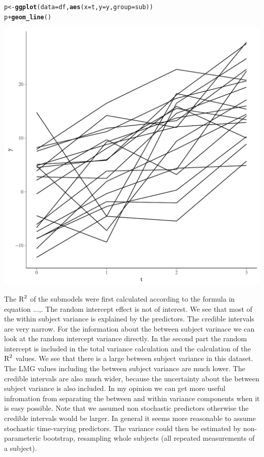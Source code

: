\documentclass[11pt,a4paper,twoside]{book}
\makeatletter
\def\maxwidth{ %
  \ifdim\Gin@nat@width>\linewidth
    \linewidth
  \else
    \Gin@nat@width
  \fi
}
\newcommand{\hlopt}[1]{\textcolor[rgb]{0,0,0}{#1}}%
\newcommand{\hlstd}[1]{\textcolor[rgb]{0.345,0.345,0.345}{#1}}%
\newcommand{\hlkwb}[1]{\textcolor[rgb]{0.69,0.353,0.396}{#1}}%
\newcommand{\hlkwc}[1]{\textcolor[rgb]{0.333,0.667,0.333}{#1}}%
\newcommand{\hlkwd}[1]{\textcolor[rgb]{0.737,0.353,0.396}{\textbf{#1}}}%
\newenvironment{kframe}{%
 \def\at@end@of@kframe{}%
 \ifinner\ifhmode%
  \def\at@end@of@kframe{\end{minipage}}%
  \begin{minipage}{\columnwidth}%
 \fi\fi%
 \def\FrameCommand##1{\hskip\@totalleftmargin \hskip-\fboxsep
 \colorbox{shadecolor}{##1}\hskip-\fboxsep
     \hskip-\linewidth \hskip-\@totalleftmargin \hskip\columnwidth}%
 \MakeFramed {\advance\hsize-\width
   \@totalleftmargin\z@ \linewidth\hsize
   \@setminipage}}%
 {\par\unskip\endMakeFramed%
 \at@end@of@kframe}
\newenvironment{knitrout}{}{} %
\makeatother
\begin{document}
\begin{knitrout}
\begin{kframe}
\begin{alltt}
\hlstd{p} \hlkwb{<-} \hlkwd{ggplot}\hlstd{(}\hlkwc{data} \hlstd{= df,} \hlkwd{aes}\hlstd{(}\hlkwc{x} \hlstd{= t,} \hlkwc{y} \hlstd{= y,} \hlkwc{group} \hlstd{= sub))}
\hlstd{p} \hlopt{+} \hlkwd{geom_line}\hlstd{()}
\end{alltt}
\end{kframe}
\includegraphics[width=\maxwidth]{figure/ch04_figsimdata_repeated-1} 

\end{knitrout}


The $\text{R}^2$ of the submodels were first calculated according to the formula in equation ...,. The random intercept effect is not of interest. We see that most of the within subject variance is explained by the predictors. The credible intervals are very narrow. For the information about the between subject varinace we can look at the random intercept variance directly. In the second part the random intercept is included in the total variance calculation and the calculation of the $\text{R}^2$ values. We see that there is a large between subject variance in this dataset. The LMG values including the between subject variance are much lower. The credible intervals are also much wider, because the uncertainty about the between subject variance is also included. In my opinion we can get more useful infromation from separating the between and within variance components when it is easy possible. Note that we assumed non stochastic predictors otherwise the credible intervals would be larger. In general it seems more reasonable to assume stochastic time-varying predictors. The variance could then be estimated by non-parameteric bootstrap, resampling whole subjects (all repeated measurements of a subject).
\end{document}
